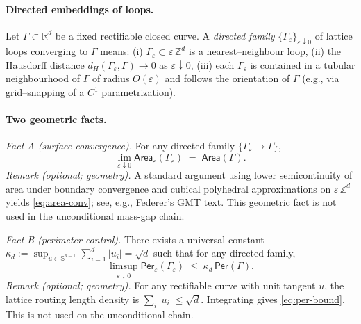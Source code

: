 \documentclass[11pt]{amsart}
\theoremstyle{plain}
\theoremstyle{definition}
\theoremstyle{remark}
\begin{document}
\paragraph{Directed embeddings of loops.}
Let $\Gamma\subset\mathbb{R}^d$ be a fixed rectifiable closed curve. A \emph{directed family} $\{\Gamma_\varepsilon\}_{\varepsilon\downarrow 0}$ of lattice loops converging to $\Gamma$ means: (i) $\Gamma_\varepsilon\subset\varepsilon\,\mathbb{Z}^d$ is a nearest--neighbour loop, (ii) the Hausdorff distance $d_H(\Gamma_\varepsilon,\Gamma)\to 0$ as $\varepsilon\downarrow 0$, (iii) each $\Gamma_\varepsilon$ is contained in a tubular neighbourhood of $\Gamma$ of radius $O(\varepsilon)$ and follows the orientation of $\Gamma$ (e.g., via grid--snapping of a $C^1$ parametrization).

\paragraph{Two geometric facts.}
\emph{Fact A (surface convergence).} For any directed family $\{\Gamma_\varepsilon\to\Gamma\}$,
\begin{equation}
\label{eq:area-conv}
  \lim_{\varepsilon\downarrow 0}\mathsf{Area}_\varepsilon(\Gamma_\varepsilon)\;=\;\mathsf{Area}(\Gamma).
\end{equation}
\emph{Remark (optional; geometry).} A standard argument using lower semicontinuity of area under boundary convergence and cubical polyhedral approximations on $\varepsilon\,\mathbb{Z}^d$ yields \eqref{eq:area-conv}; see, e.g., Federer's GMT text. This geometric fact is not used in the unconditional mass-gap chain.

\emph{Fact B (perimeter control).} There exists a universal constant $\kappa_d:=\sup_{u\in\mathbb{S}^{d-1}}\sum_{i=1}^d |u_i|=\sqrt{d}$ such that for any directed family,
\begin{equation}
\label{eq:per-bound}
  \limsup_{\varepsilon\downarrow 0}\mathsf{Per}_\varepsilon(\Gamma_\varepsilon)\;\le\;\kappa_d\,\mathsf{Per}(\Gamma).
\end{equation}
\emph{Remark (optional; geometry).} For any rectifiable curve with unit tangent $u$, the lattice routing length density is $\sum_i |u_i|\le \sqrt d$. Integrating gives \eqref{eq:per-bound}. This is not used on the unconditional chain.
\end{document}
